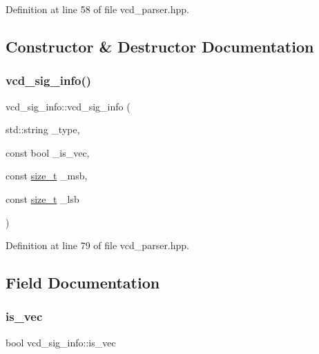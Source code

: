 Definition at line 58 of file vcd\+\_\+parser.\+hpp.



\subsection{Constructor \& Destructor Documentation}
\mbox{\label{classvcd__sig__info_a8282986d7af488cec8654feabc63960b}} 
\subsubsection{\texorpdfstring{vcd\+\_\+sig\+\_\+info()}{vcd\_sig\_info()}}
{\footnotesize\ttfamily vcd\+\_\+sig\+\_\+info\+::vcd\+\_\+sig\+\_\+info (\begin{DoxyParamCaption}\item[{std\+::string}]{\+\_\+type,  }\item[{const bool}]{\+\_\+is\+\_\+vec,  }\item[{const \hyperlink{tutorial__fpt__2017_2intro_2sixth_2test_8c_a7c94ea6f8948649f8d181ae55911eeaf}{size\+\_\+t}}]{\+\_\+msb,  }\item[{const \hyperlink{tutorial__fpt__2017_2intro_2sixth_2test_8c_a7c94ea6f8948649f8d181ae55911eeaf}{size\+\_\+t}}]{\+\_\+lsb }\end{DoxyParamCaption})\hspace{0.3cm}{\ttfamily [inline]}}



Definition at line 79 of file vcd\+\_\+parser.\+hpp.



\subsection{Field Documentation}
\mbox{\label{classvcd__sig__info_a3ea93985f431bd1fca7dadce2b0b8b46}} 
\subsubsection{\texorpdfstring{is\+\_\+vec}{is\_vec}}
{\footnotesize\ttfamily bool vcd\+\_\+sig\+\_\+info\+::is\+\_\+vec}



